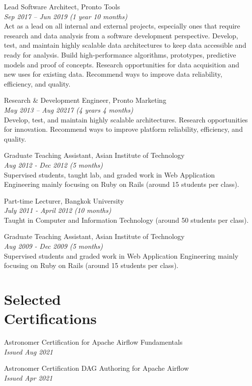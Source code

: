 \documentclass[margin, 10pt]{res}
\begin{document}
\begin{resume}
Lead Software Architect, Pronto Tools\\
{\it \small Sep 2017 -- Jun 2019 (1 year 10 months)}\\
Act as a lead on all internal and external projects, especially ones that
require research and data analysis from a software development perspective.
Develop, test, and maintain highly scalable data architectures to keep data
accessible and ready for analysis. Build high-performance algorithms,
prototypes, predictive models and proof of concepts. Research opportunities
for data acquisition and new uses for existing data. Recommend ways to
improve data reliability, efficiency, and quality.

Research \& Development Engineer, Pronto Marketing\\
{\it \small May 2013 -- Aug 20217 (4 years 4 months)}\\
Develop, test, and maintain highly scalable architectures.
Research opportunities for innovation. Recommend ways to improve
platform reliability, efficiency, and quality.

Graduate Teaching Assistant, Asian Institute of Technology\\
{\it \small Aug 2012 - Dec 2012 (5 months)}\\
Supervised students, taught lab, and graded work in Web Application Engineering
mainly focusing on Ruby on Rails (around 15 students per class).

Part-time Lecturer, Bangkok University\\
{\it \small July 2011 - April 2012 (10 months)}\\
Taught in Computer and Information Technology (around 50 students per class).

Graduate Teaching Assistant, Asian Institute of Technology\\
{\it \small Aug 2009 - Dec 2009 (5 months)}\\
Supervised students and graded work in Web Application Engineering mainly focusing
on Ruby on Rails (around 15 students per class).

\section{Selected \\ Certifications}

Astronomer Certification for Apache Airflow Fundamentals\\
{\it \small Issued Aug 2021}

Astronomer Certification DAG Authoring for Apache Airflow\\
{\it \small Issued Apr 2021}


\end{resume}
\end{document}
